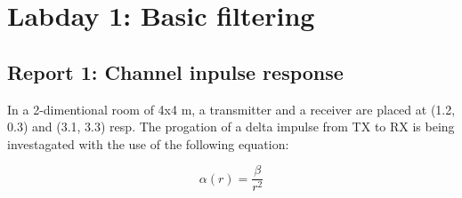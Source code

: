 \documentclass[final]{scrreprt} %
\begin{document}
\chapter{Labday 1: Basic filtering}
\label{ch:labday1}
\section{Report 1: Channel inpulse response}
In a 2-dimentional room of 4x4 m, a transmitter and a receiver are placed at (1.2, 0.3) and (3.1, 3.3) resp.
The progation of a delta impulse from TX to RX is being investagated with the use of the following equation:

\begin{equation}
	\alpha (r) = \frac{\beta}{r^2}
\label{eq:damping}
\end{equation}
\end{document}
